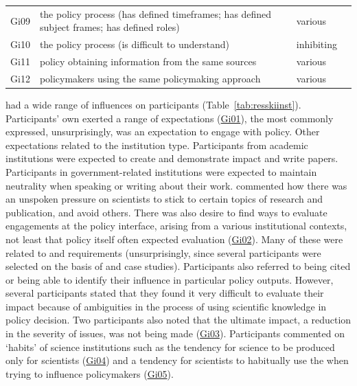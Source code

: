 \begin{table}[!ht]
\begin{tabular}{L{.07\linewidth}L{.3\linewidth}L{.11\linewidth}L{.52\linewidth}}
Gi09 & the policy process (has defined timeframes; has defined subject frames; has defined roles) & various &  \\
Gi10 & the policy process (is difficult to understand) & inhibiting &  \\
Gi11 & policy obtaining information from the same sources & various &  \\
Gi12 & policymakers using the same policymaking approach & various &  \\
\hline
\end{tabular}
\end{table}

\skiinst{} had a wide range of influences on participants (Table~\ref{tab:resskiinst}). Participants' own \skiinst{} exerted a range of expectations (\hyperref[tab:resskiinst]{Gi01}), the most commonly expressed, unsurprisingly, was an expectation to engage with policy. Other expectations related to the institution type. Participants from academic institutions were expected to create and demonstrate impact and write papers. Participants in government-related institutions were expected to maintain neutrality when speaking or writing about their work.  commented how there was an unspoken pressure on scientists to stick to certain topics of research and publication, and avoid others. There was also desire to find ways to evaluate engagements at the policy interface, arising from a various institutional contexts, not least that policy itself often expected evaluation (\hyperref[tab:resskiinst]{Gi02}). Many of these were related to \REF{} and \UKRI{} requirements (unsurprisingly, since several participants were selected on the basis of \REF{} and \UKRI{} case studies). Participants also referred to being cited or being able to identify their influence in particular policy outputs. However, several participants stated that they found it very difficult to evaluate their impact because of ambiguities in the process of using scientific knowledge in policy decision. Two participants also noted that the ultimate impact, a reduction in the severity of \CAN{} issues, was not being made (\hyperref[tab:resskiinst]{Gi03}). Participants commented on `habits' of science institutions such as the tendency for science to be produced only for scientists (\hyperref[tab:resskiinst]{Gi04}) and a tendency for scientists to habitually use the \IDM{} when trying to influence policymakers (\hyperref[tab:resskiinst]{Gi05}). 

